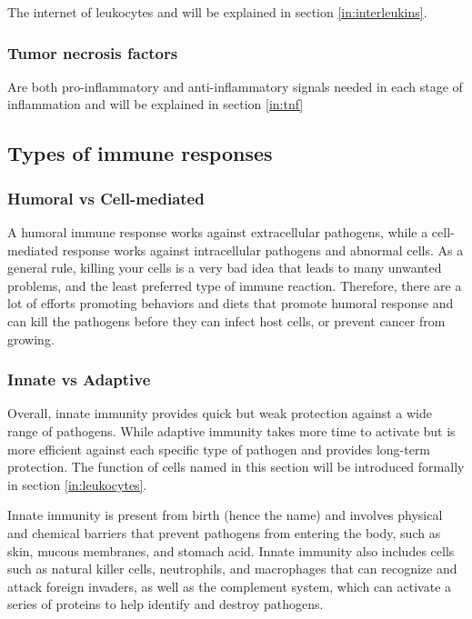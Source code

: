     The internet of leukocytes and will be explained in section \ref{in:interleukins}.

\subsubsection{Tumor necrosis factors}

    Are both pro-inflammatory and anti-inflammatory signals needed in each stage of inflammation and will be explained in section \ref{in:tnf}    

\subsection{Types of immune responses}

\subsubsection{Humoral vs Cell-mediated}
\label{ref:humural}

A humoral immune response works against extracellular pathogens, while a cell-mediated response works against intracellular pathogens and abnormal cells. As a general rule, killing your cells is a very bad idea that leads to many unwanted problems, and the least preferred type of immune reaction. Therefore, there are a lot of efforts promoting behaviors and diets that promote humoral response and can kill the pathogens before they can infect host cells, or prevent cancer from growing.



\subsubsection{Innate vs Adaptive}
\label{in:InnVSAdap}

Overall, innate immunity provides quick but weak protection against a wide range of pathogens. While adaptive immunity takes more time to activate but is more efficient against each specific type of pathogen and provides long-term protection. The function of cells named in this section will be introduced formally in section \ref{in:leukocytes}.

Innate immunity is present from birth (hence the name) and involves physical and chemical barriers that prevent pathogens from entering the body, such as skin, mucous membranes, and stomach acid. Innate immunity also includes cells such as natural killer cells, neutrophils, and macrophages that can recognize and attack foreign invaders, as well as the complement system, which can activate a series of proteins to help identify and destroy pathogens.

